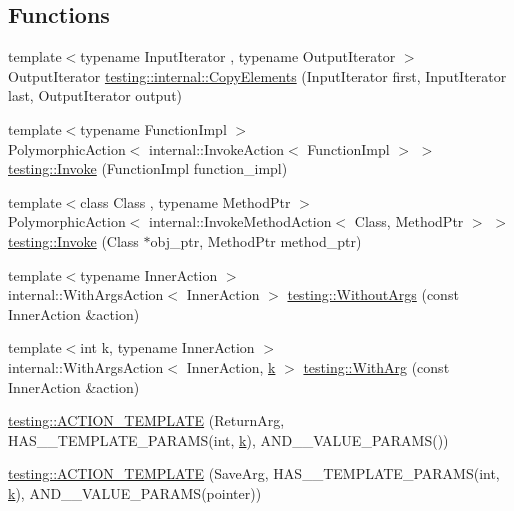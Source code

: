 \subsection*{Functions}
\begin{DoxyCompactItemize}
\item 
{\footnotesize template$<$typename Input\+Iterator , typename Output\+Iterator $>$ }\\Output\+Iterator \hyperlink{namespacetesting_1_1internal_a9372c12747bcf964aacb1284f8048cae}{testing\+::internal\+::\+Copy\+Elements} (Input\+Iterator first, Input\+Iterator last, Output\+Iterator output)
\item 
{\footnotesize template$<$typename Function\+Impl $>$ }\\Polymorphic\+Action$<$ internal\+::\+Invoke\+Action$<$ Function\+Impl $>$ $>$ \hyperlink{namespacetesting_a12aebaf8363d49a383047529f798b694}{testing\+::\+Invoke} (Function\+Impl function\+\_\+impl)
\item 
{\footnotesize template$<$class Class , typename Method\+Ptr $>$ }\\Polymorphic\+Action$<$ internal\+::\+Invoke\+Method\+Action$<$ Class, Method\+Ptr $>$ $>$ \hyperlink{namespacetesting_a80b82dc382445d240ff011f9c34aefc4}{testing\+::\+Invoke} (Class $\ast$obj\+\_\+ptr, Method\+Ptr method\+\_\+ptr)
\item 
{\footnotesize template$<$typename Inner\+Action $>$ }\\internal\+::\+With\+Args\+Action$<$ Inner\+Action $>$ \hyperlink{namespacetesting_aeac85f74bd11112f69142e92e3a50780}{testing\+::\+Without\+Args} (const Inner\+Action \&action)
\item 
{\footnotesize template$<$int k, typename Inner\+Action $>$ }\\internal\+::\+With\+Args\+Action$<$ Inner\+Action, \hyperlink{jquery_8js_ab26645c014aa005ecedef329ecf58c99}{k} $>$ \hyperlink{namespacetesting_af76590c6cecc621e1ab4b681a9ea209b}{testing\+::\+With\+Arg} (const Inner\+Action \&action)
\item 
\hyperlink{namespacetesting_a109d48f969260878ed1e743006196992}{testing\+::\+A\+C\+T\+I\+O\+N\+\_\+\+T\+E\+M\+P\+L\+A\+TE} (Return\+Arg, H\+A\+S\+\_\+\_\+\+T\+E\+M\+P\+L\+A\+T\+E\+\_\+\+P\+A\+R\+A\+MS(int, \hyperlink{jquery_8js_ab26645c014aa005ecedef329ecf58c99}{k}), A\+N\+D\+\_\+\_\+\+V\+A\+L\+U\+E\+\_\+\+P\+A\+R\+A\+MS())
\item 
\hyperlink{namespacetesting_a0478a3464d31f6726d5bc47b1be46491}{testing\+::\+A\+C\+T\+I\+O\+N\+\_\+\+T\+E\+M\+P\+L\+A\+TE} (Save\+Arg, H\+A\+S\+\_\+\_\+\+T\+E\+M\+P\+L\+A\+T\+E\+\_\+\+P\+A\+R\+A\+MS(int, \hyperlink{jquery_8js_ab26645c014aa005ecedef329ecf58c99}{k}), A\+N\+D\+\_\+\_\+\+V\+A\+L\+U\+E\+\_\+\+P\+A\+R\+A\+MS(pointer))

\end{DoxyCompactItemize}
